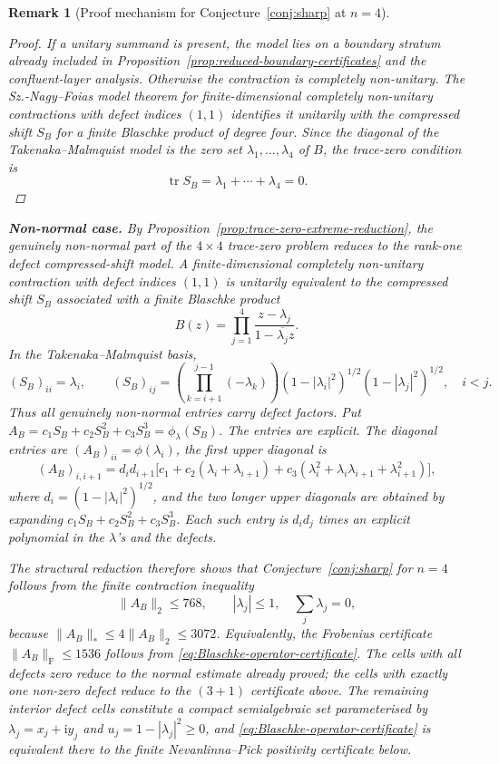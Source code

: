 \documentclass[11pt]{article}
\newtheorem{remark}[theorem]{Remark}
\numberwithin{equation}{section}
\newcommand{\ii}{\mathrm i}
\begin{document}
\begin{remark}[Proof mechanism for Conjecture~\ref{conj:sharp} at $n=4$]
\begin{proof}
If a unitary summand is present, the model lies on a boundary stratum already
included in Proposition~\ref{prop:reduced-boundary-certificates} and the
confluent-layer analysis.  Otherwise the contraction is completely
non-unitary.  The Sz.-Nagy--Foias model theorem for finite-dimensional
completely non-unitary contractions with defect indices \((1,1)\) identifies
it unitarily with the compressed shift \(S_B\) for a finite Blaschke product
of degree four.  Since the diagonal of the Takenaka--Malmquist model is the
zero set \(\lambda_1,\ldots,\lambda_4\) of \(B\), the trace-zero condition is
\[
  \operatorname{tr}S_B=\lambda_1+\cdots+\lambda_4=0.
\]
\end{proof}

\noindent\textbf{Non-normal case.}
By Proposition~\ref{prop:trace-zero-extreme-reduction}, the genuinely
non-normal part of the \(4\times4\) trace-zero problem reduces to the
rank-one defect compressed-shift model.  A finite-dimensional completely
non-unitary contraction with defect indices \((1,1)\) is unitarily equivalent
to the compressed shift \(S_B\) associated with a finite Blaschke product
\[
  B(z)=\prod_{j=1}^4\frac{z-\lambda_j}{1-\overline{\lambda_j}z}.
\]
In the Takenaka--Malmquist basis,
\[
  (S_B)_{ii}=\lambda_i,
  \qquad
  (S_B)_{ij}=\left(\prod_{k=i+1}^{j-1}(-\lambda_k)\right)
  (1-|\lambda_i|^2)^{1/2}(1-|\lambda_j|^2)^{1/2},\quad i<j .
\]
Thus all genuinely non-normal entries carry defect factors.  Put
\(A_B=c_1S_B+c_2S_B^2+c_3S_B^3=\phi_\lambda(S_B)\).
The entries are explicit.  The diagonal entries are \((A_B)_{ii}=\phi(\lambda_i)\),
the first upper diagonal is
\[
  (A_B)_{i,i+1}=d_id_{i+1}\bigl[c_1+c_2(\lambda_i+\lambda_{i+1})
  +c_3(\lambda_i^2+\lambda_i\lambda_{i+1}+\lambda_{i+1}^2)\bigr],
\]
where \(d_i=(1-|\lambda_i|^2)^{1/2}\), and the two longer upper diagonals are
obtained by expanding \(c_1S_B+c_2S_B^2+c_3S_B^3\).  Each such entry is
\(d_id_j\) times an explicit polynomial in the \(\lambda\)'s and the defects.

The structural reduction therefore shows that Conjecture~\ref{conj:sharp}
for $n=4$ follows from the finite contraction inequality
\begin{equation}\label{eq:Blaschke-operator-certificate}
  \|A_B\|_{2}\le768,
  \qquad |\lambda_j|\le1,\quad \sum_j\lambda_j=0,
\end{equation}
because \(\|A_B\|_*\le4\|A_B\|_2\le3072\).  Equivalently, the
Frobenius certificate \(\|A_B\|_{\mathrm F}\le1536\) follows from
\eqref{eq:Blaschke-operator-certificate}.
The cells with all defects zero reduce to the normal estimate already proved;
the cells with exactly one non-zero defect reduce to the $(3{+}1)$ certificate
above.  The remaining interior defect cells constitute a compact semialgebraic
set parameterised by $\lambda_j=x_j+\ii y_j$ and $u_j=1-|\lambda_j|^2\ge0$,
and \eqref{eq:Blaschke-operator-certificate} is equivalent there to the finite
Nevanlinna--Pick positivity certificate below.



\end{remark}
\end{document}
